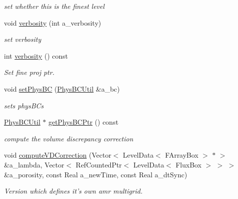 \begin{DoxyCompactItemize}
\begin{DoxyCompactList}\small\item\em set whether this is the finest level \end{DoxyCompactList}\item 
\hypertarget{class_c_c_projector_a2f4aad52da3e1285a19c6bdd6d3cc4c4}{void \hyperlink{class_c_c_projector_a2f4aad52da3e1285a19c6bdd6d3cc4c4}{verbosity} (int a\-\_\-verbosity)}\label{class_c_c_projector_a2f4aad52da3e1285a19c6bdd6d3cc4c4}

\begin{DoxyCompactList}\small\item\em set verbosity \end{DoxyCompactList}\item 
int \hyperlink{class_c_c_projector_a751e8815f9ce55d9bad3cd3fc497abd2}{verbosity} () const 
\begin{DoxyCompactList}\small\item\em Set fine proj ptr. \end{DoxyCompactList}\item 
\hypertarget{class_c_c_projector_aaf356086a1992d20d874793a6176189d}{void \hyperlink{class_c_c_projector_aaf356086a1992d20d874793a6176189d}{set\-Phys\-B\-C} (\hyperlink{class_phys_b_c_util}{Phys\-B\-C\-Util} \&a\-\_\-bc)}\label{class_c_c_projector_aaf356086a1992d20d874793a6176189d}

\begin{DoxyCompactList}\small\item\em sets phys\-B\-Cs \end{DoxyCompactList}\item 
\hyperlink{class_phys_b_c_util}{Phys\-B\-C\-Util} $\ast$ \hyperlink{class_c_c_projector_aedc2b916e5c5d387efe18d42971244cc}{get\-Phys\-B\-C\-Ptr} () const 
\begin{DoxyCompactList}\small\item\em compute the volume discrepancy correction \end{DoxyCompactList}\item 
\hypertarget{class_c_c_projector_ab8507104a097dee438e12924ab9fdbfa}{void \hyperlink{class_c_c_projector_ab8507104a097dee438e12924ab9fdbfa}{compute\-V\-D\-Correction} (Vector$<$ Level\-Data$<$ F\-Array\-Box $>$ $\ast$ $>$ \&a\-\_\-lambda, Vector$<$ Ref\-Counted\-Ptr$<$ Level\-Data$<$ Flux\-Box $>$ $>$ $>$ \&a\-\_\-porosity, const Real a\-\_\-new\-Time, const Real a\-\_\-dt\-Sync)}\label{class_c_c_projector_ab8507104a097dee438e12924ab9fdbfa}

\begin{DoxyCompactList}\small\item\em Version which defines it's own amr multigrid. \end{DoxyCompactList}\end{DoxyCompactItemize}
